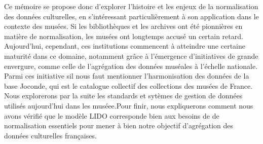 Ce mémoire se propose donc d'explorer l'histoire et les enjeux de la normalisation des données culturelles, en s'intéressant particulièrement à son application dans le contexte des musées. Si les bibliothèques et les archives ont été pionnières en matière de normalisation, les musées ont longtemps accusé un certain retard. Aujourd'hui, cependant, ces institutions commencent à atteindre une certaine maturité dans ce domaine, notamment grâce à l'émergence d’initiatives de grande envergure, comme celle de l'agrégation des données muséales à l'échelle nationale. Parmi ces initiative sil nous faut mentionner l’harmonisation des données de la base Joconde, qui est le catalogue collectif des collections des musées de France. \newline Nous explorerons par la suite les standards et sytèmes de gestion de données utilisés aujourd'hui dans les muséee.\newline Pour finir, nous expliquerons comment nous avons vérifié que le modèle LIDO corresponde bien aux besoins de de normalisation essentiels pour mener à bien notre objectif d’agrégation des données culturelles françaises.

